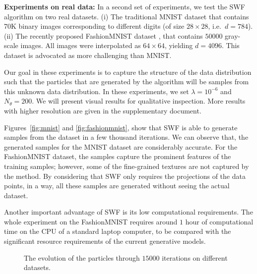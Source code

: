 \textbf{Experiments on real data: }
%
In a second set of experiments, we test the SWF algorithm on two real datasets. (i) The traditional MNIST dataset that contains 70K binary images corresponding to different digits (of size $28 \times 28$, i.e.\ $d = 784$). (ii) The recently proposed FashionMNIST dataset \cite{xiao2017fashion}, that contains $50000$ gray-scale images. All images were interpolated as $64\times 64$, yielding $d=4096$. This dataset is advocated as more challenging than MNIST. 

Our goal in these experiments is to capture the structure of the data distribution such that the particles that are generated by the algorithm will be samples from this unknown data distribution. In these experiments, we set $\lambda=10^{-6}$ and $N_\theta=200$. We will present visual results for qualitative inspection. More results with higher resolution are given in the supplementary document. 

Figures~\ref{fig:mnist} and \ref{fig:fashionmnist}, show that SWF is able to generate samples from the dataset in a few thousand iterations. We can observe that, the generated samples for the MNIST dataset are considerably accurate. For the FashionMNIST dataset, the samples capture the prominent features of the training samples; however, some of the fine-grained textures are not captured by the method. By considering that SWF only requires the projections of the data points, in a way, all these samples are generated without seeing the actual dataset.


Another important advantage of SWF is its low computational requirements. The whole experiment on the FashionMNIST requires around $1$ hour of computational time on the CPU of a standard laptop computer, to be compared with the significant resource requirements of the current generative models.








\begin{figure}[t]
\centering
{}\hfill
{}
\vspace{-10pt}
\caption{The evolution of the particles through $15000$ iterations on different datasets.}
\end{figure}

